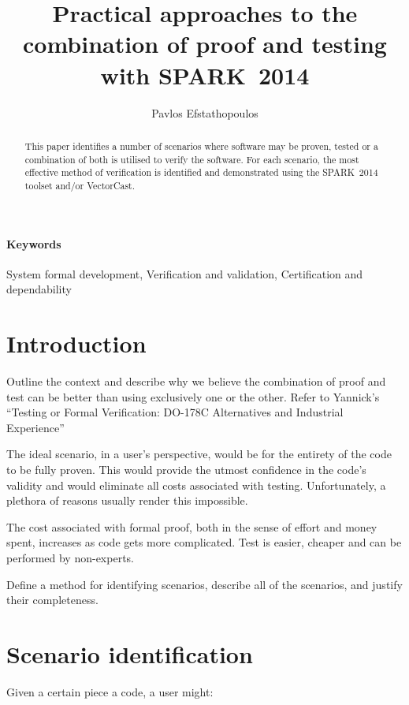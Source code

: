 \documentclass{llncs}
\newcommand{\newspark}{SPARK~2014\xspace}
\begin{document}
\title{Practical approaches to the combination of proof and testing with \newspark}

\author{Pavlos Efstathopoulos}

\maketitle

\begin{abstract}
This paper identifies a number of scenarios where software may
be proven, tested or a combination of both is utilised to verify the
software. For each scenario, the most effective method of verification
is identified and demonstrated using the \newspark toolset and/or
VectorCast.
\end{abstract}

\paragraph{Keywords}
System formal development, Verification and validation,
Certification and dependability

\section{Introduction}
Outline the context and describe why we believe the combination of proof
and test can be better than using exclusively one or the other. Refer to Yannick's
``Testing or Formal Verification: DO-178C Alternatives and Industrial Experience''

The ideal scenario, in a user's perspective, would be for the entirety of the code
to be fully proven. This would provide the utmost confidence in the code's validity
and would eliminate all costs associated with testing. Unfortunately, a plethora of
reasons usually render this impossible.

The cost associated with formal proof, both in the sense of effort and money spent,
increases as code gets more complicated. Test is easier, cheaper and can be performed
by non-experts.

Define a method for identifying scenarios, describe all of the scenarios,
and justify their completeness.


\section{Scenario identification}
Given a certain piece a code, a user might:
\end{document}
